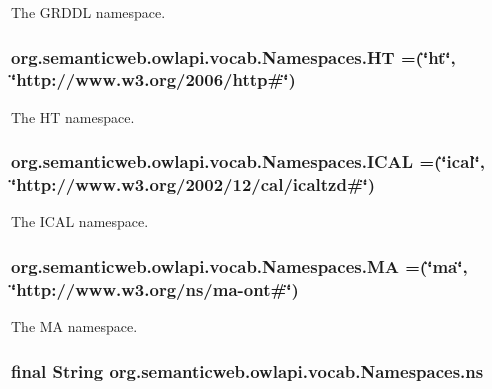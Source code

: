 The G\-R\-D\-D\-L namespace. \hypertarget{enumorg_1_1semanticweb_1_1owlapi_1_1vocab_1_1_namespaces_a10a85d64e15717c9cf37bcfb11a607fa}{
\subsubsection[{H\-T}]{\setlength{\rightskip}{0pt plus 5cm}org.\-semanticweb.\-owlapi.\-vocab.\-Namespaces.\-H\-T =(\char`\"{}ht\char`\"{}, \char`\"{}http\-://www.\-w3.\-org/2006/http\#\char`\"{})}}\label{enumorg_1_1semanticweb_1_1owlapi_1_1vocab_1_1_namespaces_a10a85d64e15717c9cf37bcfb11a607fa}
The H\-T namespace. \hypertarget{enumorg_1_1semanticweb_1_1owlapi_1_1vocab_1_1_namespaces_aafcadb9bef2950634b7eb05cba4d4df3}{
\subsubsection[{I\-C\-A\-L}]{\setlength{\rightskip}{0pt plus 5cm}org.\-semanticweb.\-owlapi.\-vocab.\-Namespaces.\-I\-C\-A\-L =(\char`\"{}ical\char`\"{}, \char`\"{}http\-://www.\-w3.\-org/2002/12/cal/icaltzd\#\char`\"{})}}\label{enumorg_1_1semanticweb_1_1owlapi_1_1vocab_1_1_namespaces_aafcadb9bef2950634b7eb05cba4d4df3}
The I\-C\-A\-L namespace. \hypertarget{enumorg_1_1semanticweb_1_1owlapi_1_1vocab_1_1_namespaces_a83bab0f8ccb78f35fc420d382e6df530}{
\subsubsection[{M\-A}]{\setlength{\rightskip}{0pt plus 5cm}org.\-semanticweb.\-owlapi.\-vocab.\-Namespaces.\-M\-A =(\char`\"{}ma\char`\"{}, \char`\"{}http\-://www.\-w3.\-org/{\bf ns}/ma-\/ont\#\char`\"{})}}\label{enumorg_1_1semanticweb_1_1owlapi_1_1vocab_1_1_namespaces_a83bab0f8ccb78f35fc420d382e6df530}
The M\-A namespace. \hypertarget{enumorg_1_1semanticweb_1_1owlapi_1_1vocab_1_1_namespaces_a88428054d2db7e7520b71b395aef20ac}{
\subsubsection[{ns}]{\setlength{\rightskip}{0pt plus 5cm}final String org.\-semanticweb.\-owlapi.\-vocab.\-Namespaces.\-ns}}\label{enumorg_1_1semanticweb_1_1owlapi_1_1vocab_1_1_namespaces_a88428054d2db7e7520b71b395aef20ac}
